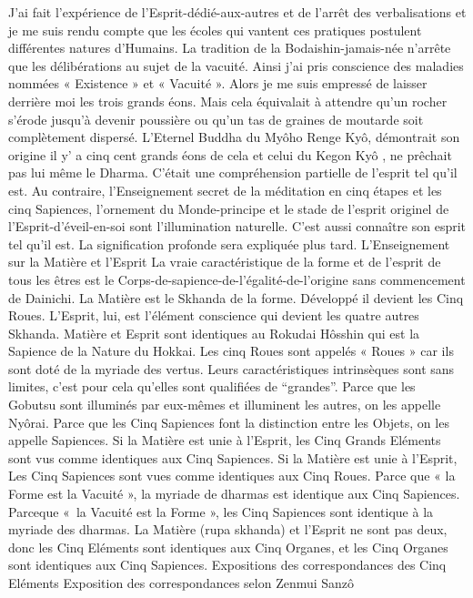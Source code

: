 J'ai fait l'expérience de l’Esprit-dédié-aux-autres et de l'arrêt des verbalisations et je me suis rendu compte que les écoles qui vantent ces pratiques postulent différentes natures d'Humains.
La tradition de la Bodaishin-jamais-née n'arrête que les délibérations au sujet de la vacuité. Ainsi j'ai pris conscience des maladies nommées « Existence » et « Vacuité ». Alors je me suis empressé de laisser derrière moi les trois grands éons. Mais cela équivalait à attendre qu'un rocher s'érode jusqu'à devenir poussière ou qu'un tas de graines de moutarde soit complètement dispersé.
L’Eternel Buddha du Myôho Renge Kyô, démontrait son origine il y’ a cinq cent grands éons de cela et celui du Kegon Kyô , ne prêchait pas lui même le Dharma. C’était une compréhension partielle de l’esprit tel qu’il est.
Au contraire, l'Enseignement secret de la méditation en cinq étapes et les cinq Sapiences, l’ornement du Monde-principe et le stade de l’esprit originel de l’Esprit-d’éveil-en-soi sont l’illumination naturelle. C’est aussi connaître son esprit tel qu’il est. La signification profonde sera expliquée plus tard.
L'Enseignement sur la Matière et l'Esprit
La vraie caractéristique de la forme et de l’esprit de tous les êtres est le Corps-de-sapience-de-l’égalité-de-l’origine sans commencement de Dainichi.
 La  Matière est le Skhanda de la forme. Développé il devient les Cinq Roues. L’Esprit, lui, est l’élément conscience qui devient les quatre autres Skhanda. Matière et Esprit sont identiques au Rokudai Hôsshin qui est la Sapience de la Nature du Hokkai.
Les cinq Roues sont appelés « Roues » car ils sont doté de la myriade des vertus. Leurs caractéristiques intrinsèques sont sans limites, c’est pour cela qu’elles sont qualifiées de “grandes”. Parce que les Gobutsu sont illuminés par eux-mêmes et illuminent les autres, on les appelle Nyôrai.
Parce que les Cinq Sapiences font la distinction entre les Objets, on les appelle Sapiences.
Si la Matière est unie à l'Esprit, les Cinq Grands Eléments sont vus comme identiques aux Cinq Sapiences. Si la Matière est unie à l'Esprit, Les Cinq Sapiences sont vues comme identiques aux Cinq Roues.
Parce que « la Forme est la Vacuité », la myriade de dharmas est identique aux Cinq Sapiences.  Parceque « la Vacuité est la Forme », les Cinq Sapiences sont identique à la myriade des dharmas.
La Matière (rupa skhanda) et l'Esprit ne sont pas deux, donc les Cinq Eléments sont identiques aux Cinq Organes, et les Cinq Organes sont identiques aux Cinq Sapiences.
Expositions des correspondances des Cinq Eléments
Exposition des correspondances selon Zenmui Sanzô

